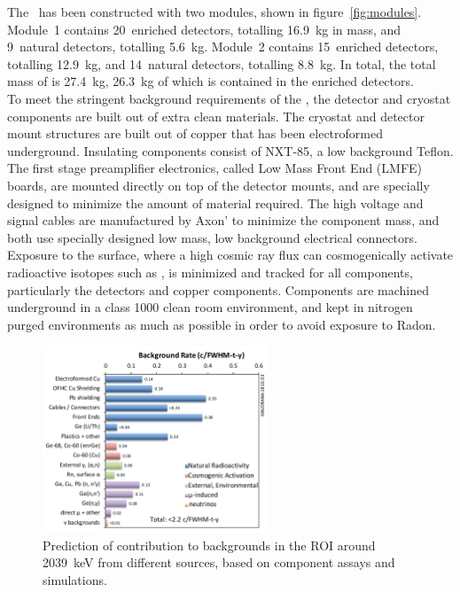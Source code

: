 \documentclass[/main.tex]{subfiles}
\begin{document}
The \MJD\ has been constructed with two modules, shown in figure~\ref{fig:modules}.
Module~1 contains 20~enriched detectors, totalling 16.9~kg in mass, and 9~natural detectors, totalling 5.6~kg.
Module~2 contains 15~enriched detectors, totalling 12.9~kg, and 14~natural detectors, totalling 8.8~kg.
In total, the total mass of  is 27.4~kg, 26.3~kg of which is contained in the enriched detectors.
\\
To meet the stringent background requirements of the \MJD, the detector and cryostat components are built out of extra clean materials.
The cryostat and detector mount structures are built out of copper that has been electroformed underground\cite{mjdeforming}.
Insulating components consist of NXT-85, a low background Teflon.
The first stage preamplifier electronics, called Low Mass Front End (LMFE) boards, are mounted directly on top of the detector mounts, and are specially designed to minimize the amount of material required.
The high voltage and signal cables are manufactured by Axon' to minimize the component mass, and both use specially designed low mass, low background electrical connectors\cite{mjdHV, mjdsig}.
Exposure to the surface, where a high cosmic ray flux can cosmogenically activate radioactive isotopes such as , is minimized and tracked for all components, particularly the detectors and copper components\cite{mjdptdb}.
Components are machined underground in a class 1000 clean room environment, and kept in nitrogen purged environments as much as possible in order to avoid exposure to Radon.
\begin{figure}
  \centering
  \includegraphics[width=0.6\textwidth]{bgassay}
  \caption[Background predictions based on component assays]{\label{fig:assay}
    Prediction of contribution to backgrounds in the ROI around 2039~keV from different sources, based on component assays and simulations.
  }
\end{figure}
\end{document}
